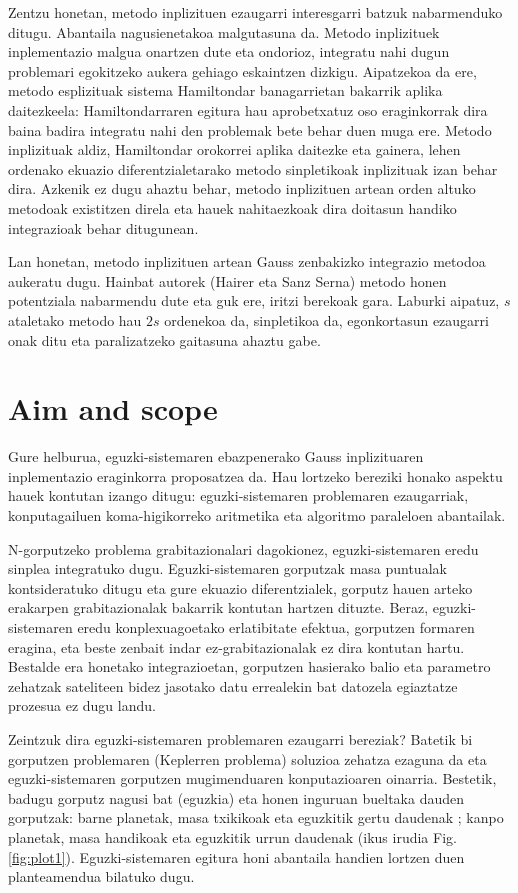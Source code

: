 Zentzu honetan, metodo inplizituen ezaugarri interesgarri batzuk nabarmenduko ditugu. Abantaila nagusienetakoa malgutasuna da.  Metodo inplizituek inplementazio malgua onartzen dute eta ondorioz, integratu nahi dugun problemari egokitzeko aukera gehiago eskaintzen dizkigu. Aipatzekoa da ere, metodo esplizituak sistema Hamiltondar banagarrietan bakarrik aplika daitezkeela: Hamiltondarraren egitura hau aprobetxatuz oso eraginkorrak dira baina badira integratu nahi den problemak bete behar duen muga ere. Metodo inplizituak aldiz, Hamiltondar orokorrei aplika daitezke eta gainera, lehen ordenako ekuazio diferentzialetarako  metodo sinpletikoak inplizituak izan behar dira.  Azkenik ez dugu ahaztu behar, metodo inplizituen artean orden altuko metodoak existitzen direla  eta hauek nahitaezkoak dira doitasun handiko integrazioak behar ditugunean.     

Lan honetan, metodo inplizituen artean Gauss zenbakizko integrazio metodoa aukeratu dugu. Hainbat autorek (Hairer \cite{Hairer2006}\cite{Hairer2008} eta Sanz Serna\cite{JMSanz-Serna1994}) metodo honen potentziala nabarmendu dute eta guk ere, iritzi berekoak gara. Laburki aipatuz, $s$ ataletako metodo hau $2s$ ordenekoa da, sinpletikoa da, egonkortasun ezaugarri onak ditu eta paralizatzeko gaitasuna ahaztu gabe.      

\section{Aim and scope}

Gure helburua, eguzki-sistemaren ebazpenerako Gauss inplizituaren inplementazio eraginkorra proposatzea da. Hau lortzeko  bereziki honako aspektu hauek kontutan izango ditugu: eguzki-sistemaren problemaren ezaugarriak, konputagailuen koma-higikorreko aritmetika eta algoritmo paraleloen abantailak.  

N-gorputzeko problema grabitazionalari dagokionez, eguzki-sistemaren eredu sinplea integratuko dugu. Eguzki-sistemaren gorputzak masa puntualak kontsideratuko ditugu eta gure ekuazio diferentzialek, gorputz hauen arteko erakarpen grabitazionalak bakarrik kontutan hartzen dituzte. Beraz, eguzki-sistemaren eredu konplexuagoetako erlatibitate efektua, gorputzen formaren eragina, eta beste zenbait indar ez-grabitazionalak ez dira kontutan hartu.
Bestalde era honetako integrazioetan, gorputzen hasierako balio eta parametro zehatzak sateliteen bidez jasotako datu errealekin bat datozela egiaztatze prozesua ez dugu landu.

Zeintzuk dira eguzki-sistemaren problemaren ezaugarri bereziak? Batetik bi gorputzen problemaren (Keplerren problema) soluzioa zehatza ezaguna da eta eguzki-sistemaren gorputzen mugimenduaren konputazioaren oinarria. Bestetik,  badugu gorputz nagusi bat (eguzkia) eta honen inguruan bueltaka dauden gorputzak: barne planetak, masa txikikoak eta eguzkitik gertu daudenak ; kanpo planetak, masa handikoak eta eguzkitik urrun daudenak (ikus irudia Fig.\ref{fig:plot1}). Eguzki-sistemaren egitura honi abantaila handien lortzen duen planteamendua bilatuko dugu.



